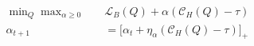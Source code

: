 \documentclass[border=7pt]{standalone}
\begin{document}
\color{ink}
$\displaystyle \begin{aligned} \min_Q\max_{\alpha\geq0}\quad&\mathcal L_B(Q)+\alpha(\mathcal C_H(Q)-\tau)\\ \alpha_{t+1}&=\big[\alpha_t+\eta_\alpha(\mathcal C_H(Q)-\tau)\big]_+\end{aligned}$
\end{document}
